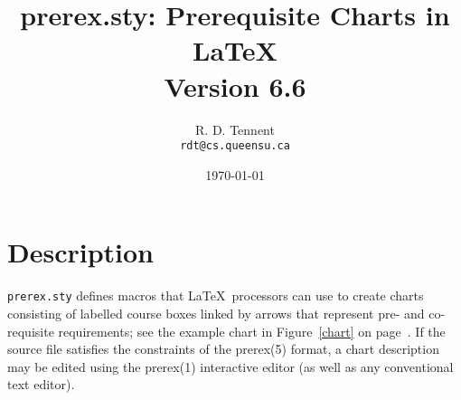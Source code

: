 \documentclass[11pt]{article}
\begin{document}
\title{\textsf{prerex.sty}: Prerequisite Charts in \LaTeX\\{\large Version 6.6}}
\author{R. D. Tennent\\\texttt{rdt@cs.queensu.ca}}
\date{\today}
\maketitle 
\thispagestyle{empty}

\section{Description}
\texttt{prerex.sty}
defines macros that 
\LaTeX\ processors
can use
to create charts consisting of labelled course boxes linked by arrows
that represent pre- and co-requisite requirements; see
the example chart in Figure~\ref{chart} on page~\pageref{chart}.
If the source file satisfies the constraints
of the
\textsf{prerex(5)}
format, a chart description may be edited using the
\textsf{prerex(1)}
interactive editor (as well as any conventional text editor).
\end{document}
